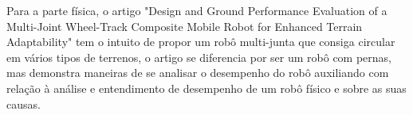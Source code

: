Para a parte física, o artigo "Design and Ground Performance Evaluation of a Multi-Joint Wheel-Track Composite Mobile Robot for Enhanced Terrain Adaptability"\cite{Gao2023} tem o intuito de propor um robô multi-junta que consiga circular em vários tipos de terrenos, o artigo se diferencia por ser um robô com pernas, mas demonstra maneiras de se analisar o desempenho do robô auxiliando com relação à análise e entendimento de desempenho de um robô físico e sobre as suas causas.


